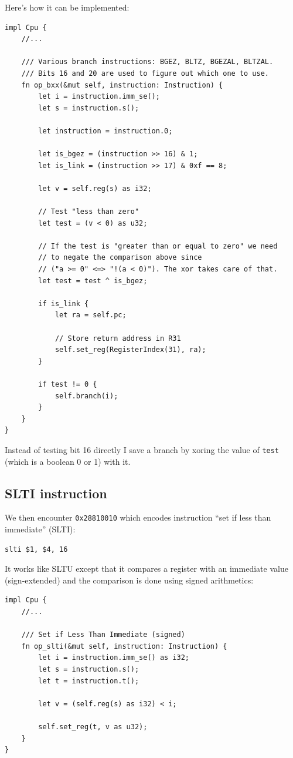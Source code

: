 \documentclass[a4paper]{article}
\newcommand{\code}[1] {\texttt{#1}}
\begin{document}
Here's how it can be implemented:

\begin{lstlisting}
impl Cpu {
    //...

    /// Various branch instructions: BGEZ, BLTZ, BGEZAL, BLTZAL.
    /// Bits 16 and 20 are used to figure out which one to use.
    fn op_bxx(&mut self, instruction: Instruction) {
        let i = instruction.imm_se();
        let s = instruction.s();

        let instruction = instruction.0;

        let is_bgez = (instruction >> 16) & 1;
        let is_link = (instruction >> 17) & 0xf == 8;

        let v = self.reg(s) as i32;

        // Test "less than zero"
        let test = (v < 0) as u32;

        // If the test is "greater than or equal to zero" we need
        // to negate the comparison above since
        // ("a >= 0" <=> "!(a < 0)"). The xor takes care of that.
        let test = test ^ is_bgez;

        if is_link {
            let ra = self.pc;

            // Store return address in R31
            self.set_reg(RegisterIndex(31), ra);
        }

        if test != 0 {
            self.branch(i);
        }
    }
}
\end{lstlisting}

Instead of testing bit 16 directly I save a branch by xoring the value
of \code{test} (which is a boolean 0 or 1) with it.

\subsection{SLTI instruction}

We then encounter \code{0x28810010} which encodes instruction ``set if
less than immediate'' (SLTI):

\begin{lstlisting}[language=assembly]
slti $1, $4, 16
\end{lstlisting}

It works like SLTU except that it compares a register with an
immediate value (sign-extended) and the comparison is done using
signed arithmetics:

\begin{lstlisting}
impl Cpu {
    //...

    /// Set if Less Than Immediate (signed)
    fn op_slti(&mut self, instruction: Instruction) {
        let i = instruction.imm_se() as i32;
        let s = instruction.s();
        let t = instruction.t();

        let v = (self.reg(s) as i32) < i;

        self.set_reg(t, v as u32);
    }
}
\end{lstlisting}
\end{document}
